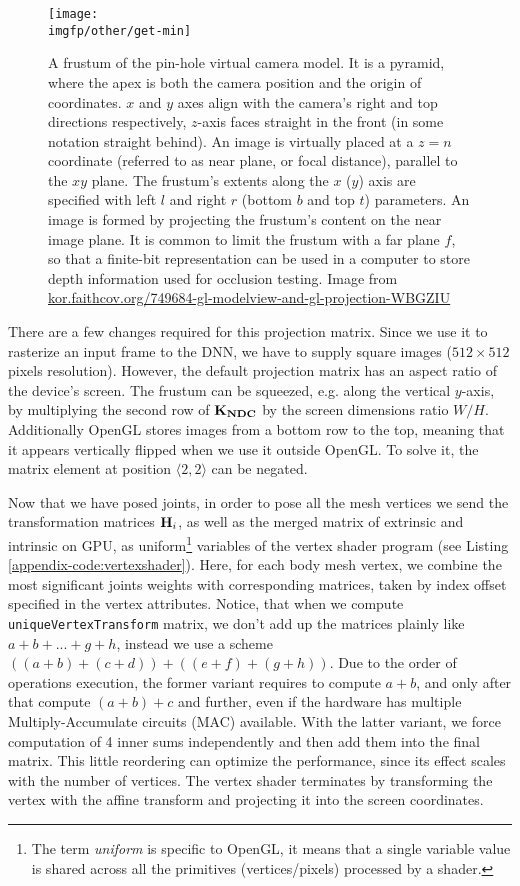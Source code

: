 \begin{figure}
	\centering
	\texttt{[image: \\imgfp/other/get-min]}
	\caption{A frustum of the pin-hole virtual camera model. It is a pyramid, where the apex is both the camera position and the origin of coordinates. $x$ and $y$ axes align with the camera's right and top directions respectively, $z$-axis faces straight in the front (in some notation straight behind). An image is virtually placed at a $z = n$ coordinate (referred to as near plane, or focal distance), parallel to the $xy$ plane. The frustum's extents along the $x$ ($y$) axis are specified with left $l$ and right $r$ (bottom $b$ and top $t$) parameters. An image is formed by projecting the frustum's content on the near image plane. It is common to limit the frustum with a far plane $f$, so that a finite-bit representation can be used in a computer to store depth information used for occlusion testing. Image from \href{https://kor.faithcov.org/749684-gl-modelview-and-gl-projection-WBGZIU}{kor.faithcov.org/749684-gl-modelview-and-gl-projection-WBGZIU}}
	\label{fig:frustum}
\end{figure}


There are a few changes required for this projection matrix. Since we use it to rasterize an input frame to the DNN, we have to supply square images ($512 \times 512$ pixels resolution). However, the default projection matrix has an aspect ratio of the device's screen. The frustum can be squeezed, e.g. along the vertical $y$-axis, by multiplying the second row of $\bm{\mathrm{K_{NDC}}}$ by the screen dimensions ratio $W / H$. Additionally OpenGL stores images from a bottom row to the top, meaning that it appears vertically flipped when we use it outside OpenGL. To solve it, the matrix element at position $\langle 2, 2 \rangle$ can be negated.

Now that we have posed joints, in order to pose all the mesh vertices we send the transformation matrices $\bm{\mathrm{H}}_i$, as well as the merged matrix of extrinsic and intrinsic on GPU, as uniform\footnote{The term \textit{uniform} is specific to OpenGL, it means that a single variable value is shared across all the primitives (vertices/pixels) processed by a shader.} variables of the vertex shader program (see Listing \ref{appendix-code:vertexshader}). Here, for each body mesh vertex, we combine the most significant joints weights with corresponding matrices, taken by index offset specified in the vertex attributes. Notice, that when we compute \verb|uniqueVertexTransform| matrix, we don't add up the matrices plainly like $a + b + ... + g + h$, instead we use a scheme $((a + b) + (c + d)) + ((e + f) + (g + h))$. Due to the order of operations execution, the former variant requires to compute $a + b$, and only after that compute $(a+b) + c$ and further, even if the hardware has multiple Multiply-Accumulate circuits (MAC) available. With the latter variant, we force computation of 4 inner sums independently and then add them into the final matrix. This little reordering can optimize the performance, since its effect scales with the number of vertices. The vertex shader terminates by transforming the vertex with the affine transform and projecting it into the screen coordinates. 

